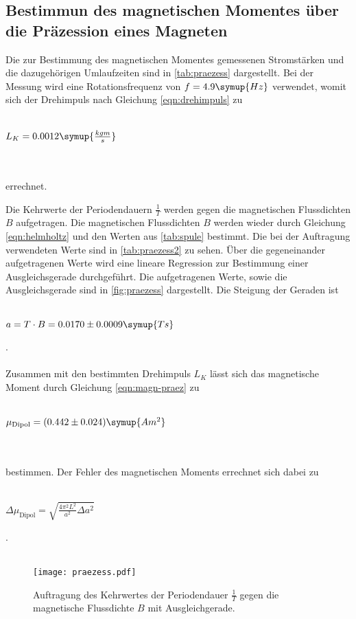     \subsection{Bestimmun des magnetischen Momentes über die Präzession eines Magneten}
        Die zur Bestimmung des magnetischen Momentes gemessenen Stromstärken und die dazugehörigen Umlaufzeiten sind in \autoref{tab:praezess}
        dargestellt. Bei der Messung wird eine Rotationsfrequenz von $f = 4.9 \symup{Hz}$  verwendet, womit sich der Drehimpuls nach
        Gleichung \eqref{eqn:drehimpuls} zu 
        \\ \\
        \centerline{$L_K = 0.0012 \symup{\frac{kg m}{s}}$}
        \\ \\
        errechnet. 
        
        Die Kehrwerte der Periodendauern $\frac{1}{T}$ werden gegen die magnetischen Flussdichten $B$ aufgetragen.
        Die magnetischen Flussdichten $B$ werden wieder durch Gleichung \eqref{eqn:helmholtz} und den Werten aus \autoref{tab:spule}
        bestimmt. Die bei der Auftragung verwendeten Werte sind in \autoref{tab:praezess2} zu sehen. Über die gegeneinander 
        aufgetragenen Werte wird eine lineare Regression zur Bestimmung einer Ausgleichsgerade durchgeführt. Die aufgetragenen Werte,
        sowie die Ausgleichsgerade sind in \autoref{fig:praezess} dargestellt.
        Die Steigung der Geraden ist 
        \\ \\
        \centerline{$a = T \cdot B = 0.0170 \pm 0.0009 \symup{T s}$}.
        \\ \\
        Zusammen mit den bestimmten Drehimpuls $L_K$ lässt sich das magnetische Moment durch Gleichung \eqref{eqn:magn-praez} zu
        \\ \\
        \centerline{$\mu_\text{Dipol} = (0.442 \pm 0.024) \symup{A m^2}$}
        \\ \\
        bestimmen.
        Der Fehler des magnetischen Moments errechnet sich dabei zu 
        \\ \\ 
        \centerline{$\Delta\mu_\text{Dipol} = \sqrt{\frac{4 \pi^2 L^2}{a^2} \Delta a^2} $}.
        \\ \\
        
          \begin{figure}
        \centering
        \texttt{[image: praezess.pdf]}
        \caption{Auftragung des Kehrwertes der Periodendauer $\frac{1}{T}$ gegen die magnetische Flussdichte $B$ mit Ausgleichgerade.}
        \label{fig:praezess}
    \end{figure}